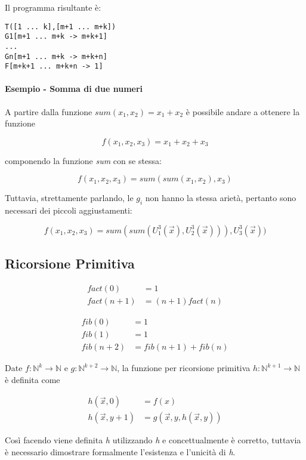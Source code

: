 Il programma risultante è:

\begin{lstlisting}[language=URM]
T([1 ... k],[m+1 ... m+k])
G1[m+1 ... m+k -> m+k+1]
...
Gn[m+1 ... m+k -> m+k+n]
F[m+k+1 ... m+k+n -> 1]
\end{lstlisting}

\paragraph{Esempio - Somma di due numeri}\label{esempio}

A partire dalla funzione $sum(x_1, x_2) = x_1+x_2$ è possibile andare a ottenere la funzione

$$f(x_1, x_2, x_3) = x_1 + x_2 +x_3$$

componendo la funzione \textit{sum} con se stessa:

$$f(x_1, x_2, x_3) = sum(sum(x_1,x_2),x_3)$$

Tuttavia, strettamente parlando, le $g_i$ non hanno la stessa
arietà, pertanto sono necessari dei piccoli aggiustamenti:

$$f(x_1, x_2, x_3) = sum(sum(U_1^{3}(\vec{x}),U_2^3(\vec{x}))), U_3^3(\vec{x}))$$

\subsection{Ricorsione Primitiva}\label{ricorsione-primitiva}

\begin{align*}
	fact(0) &= 1 \\
	fact(n+1) &= (n+1)fact(n)
\end{align*}

\begin{align*}
	fib(0) &= 1 \\
	fib(1) &= 1 \\
	fib(n+2) &= fib(n+1) + fib(n)
\end{align*}

Date $f: \mathbb{N}^k \rightarrow \mathbb{N}$ e $g:\mathbb{N}^{k+2} \rightarrow \mathbb{N}$, la funzione per ricorsione primitiva $h: \mathbb{N}^{k+1} \rightarrow \mathbb{N}$ è definita come

\begin{align*}
	h(\vec{x}, 0) &= f(x) \\
	h(\vec{x}, y+1) &= g(\vec{x}, y, h(\vec{x},y))
\end{align*}

Così facendo viene definita \emph{h} utilizzando \emph{h} e
concettualmente è corretto, tuttavia è necessario dimostrare formalmente
l'esistenza e l'unicità di \emph{h}.


